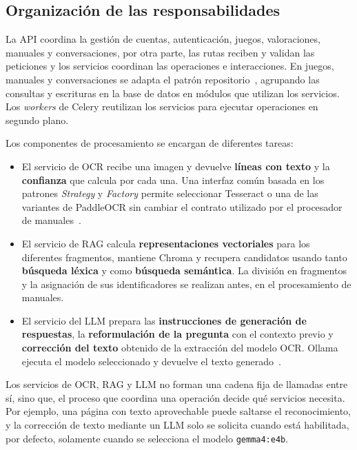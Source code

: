 
\FloatBarrier
\subsection{Organización de las responsabilidades}

La \ac{API} coordina la gestión de cuentas, autenticación, juegos,
valoraciones, manuales y conversaciones, por otra parte, las rutas reciben y validan las
peticiones y los servicios coordinan las operaciones e interacciones.
En juegos, manuales y conversaciones se adapta el patrón repositorio~\cite[cap.~2]{percival_gregory_architecture}, agrupando las consultas y escrituras
en la base de datos en módulos que utilizan los servicios.
Los \textit{workers} de Celery reutilizan los servicios
para ejecutar operaciones en segundo plano.

Los componentes de procesamiento se encargan de diferentes tareas:

\begin{itemize}
    \item El servicio de \ac{OCR} recibe una imagen y devuelve \textbf{líneas con texto} y la \textbf{confianza} que calcula por cada una. Una interfaz
    común basada en los patrones \textit{Strategy} y
    \textit{Factory} permite seleccionar Tesseract o una de las variantes de
    PaddleOCR sin cambiar el contrato utilizado por el
    procesador de manuales~\cite{patterns}.
    \item El servicio de \ac{RAG} calcula \textbf{representaciones vectoriales} para los
    diferentes fragmentos, mantiene
    Chroma y recupera candidatos usando tanto \textbf{búsqueda léxica} y como \textbf{búsqueda semántica}. La división
    en fragmentos y la asignación de sus identificadores se realizan antes, en el
    procesamiento de manuales.
    \item El servicio del \ac{LLM} prepara las \textbf{instrucciones de generación de respuestas},
    la \textbf{reformulación de la pregunta} con el contexto previo y \textbf{corrección del texto}
    obtenido de la extracción del modelo \ac{OCR}.
    Ollama ejecuta el modelo seleccionado y devuelve el texto generado~\cite{ollama_generate}.
\end{itemize}

Los servicios de \ac{OCR}, \ac{RAG} y \ac{LLM} no forman una cadena fija de llamadas
entre sí, sino que, el proceso que coordina una operación decide qué servicios necesita.
Por ejemplo, una página con texto aprovechable puede saltarse el reconocimiento,
y la corrección de texto mediante un \ac{LLM} solo se solicita cuando está habilitada, por defecto, solamente cuando se selecciona el modelo \texttt{gemma4:e4b}.

